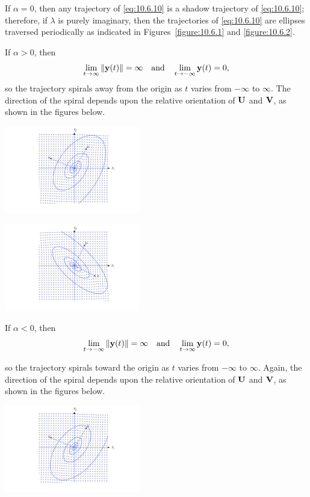 \documentclass{ximera}
\begin{document}
If $\alpha=0$, then any trajectory of \eqref{eq:10.6.10} is a shadow
trajectory of \eqref{eq:10.6.10};  therefore, if $\lambda$ is purely
imaginary, then the trajectories of \eqref{eq:10.6.10} are ellipses
traversed
periodically as indicated in Figures~\ref{figure:10.6.1} and
\ref{figure:10.6.2}.


If $\alpha>0$, then
$$
\lim_{t\rightarrow\infty}\norm{{\bf y}(t)}=\infty\quad\mbox{and}\quad
\lim_{t\rightarrow-\infty}{\bf y}(t)=0,
$$
so the trajectory spirals away from the origin as $t$ varies from
$-\infty$ to $\infty$. The direction of the spiral depends upon the
relative orientation of ${\bf U}$ and ${\bf V}$, as shown in
the figures below.

\begin{image}
 \includegraphics[height=1.5in]{fig100603.jpg} 
\end{image}

\begin{image}
 \includegraphics[height=1.5in]{fig100604.jpg} 
\end{image}


If $\alpha<0$,  then
$$
\lim_{t\rightarrow-\infty}\norm{{\bf y}(t)}=\infty\quad\mbox{and}\quad
\lim_{t\rightarrow\infty}{\bf y}(t)=0,
$$

so the trajectory spirals toward the origin as $t$ varies from
$-\infty$ to $\infty$. Again, the direction of the spiral depends upon
the relative orientation of ${\bf U}$ and ${\bf V}$, as shown in the figures below.

\begin{image}
 \includegraphics[height=1.5in]{fig100605.jpg} 
\end{image}
\end{document}
